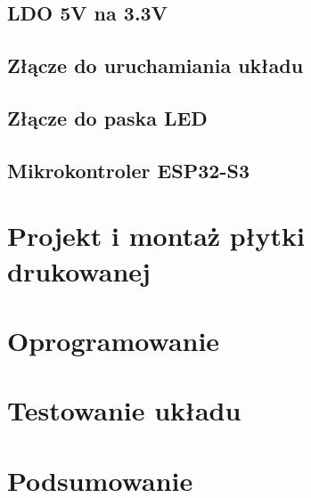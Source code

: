 \documentclass[twoside]{article}
\numberwithin{equation}{section}
\begin{document}
\subsection{LDO 5V na 3.3V}

\newpage

\subsection{Złącze do uruchamiania układu}

\newpage

\subsection{Złącze do paska LED}

\newpage

\subsection{Mikrokontroler ESP32-S3}

\newpage

\section{Projekt i montaż płytki drukowanej}


\newpage

\section{Oprogramowanie}

\newpage

\section{Testowanie układu}
\label{sec:testy}

\newpage

\section{Podsumowanie}

\newpage

\printbibliography[]
\newpage
\listoffigures
{}
\newpage
\listoftables
{}
\end{document}
